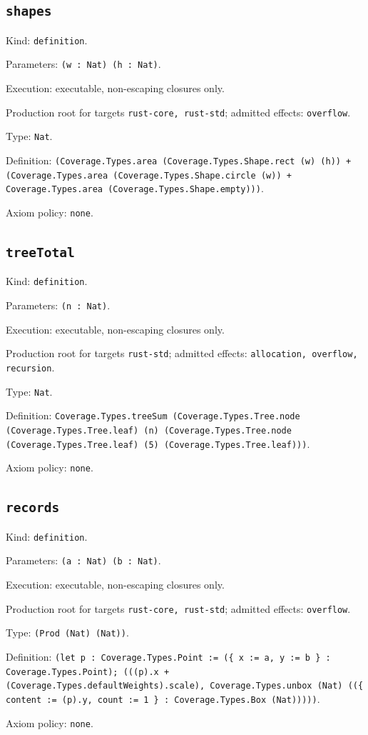 \documentclass[11pt]{article}
\begin{document}
\subsection*{\texttt{shapes}}
\noindent Kind: \texttt{definition}.\par
\noindent Parameters: \texttt{(w : Nat) (h : Nat)}.\par
\noindent Execution: executable, non-escaping closures only.\par
\noindent Production root for targets \texttt{rust-core, rust-std}; admitted effects: \texttt{overflow}.\par
\noindent Type: \texttt{Nat}.\par
\noindent Definition: \texttt{(Coverage.Types.area (Coverage.Types.Shape.rect (w) (h)) + (Coverage.Types.area (Coverage.Types.Shape.circle (w)) + Coverage.Types.area (Coverage.Types.Shape.empty)))}.\par
\noindent Axiom policy: \texttt{none}.\par
\subsection*{\texttt{treeTotal}}
\noindent Kind: \texttt{definition}.\par
\noindent Parameters: \texttt{(n : Nat)}.\par
\noindent Execution: executable, non-escaping closures only.\par
\noindent Production root for targets \texttt{rust-std}; admitted effects: \texttt{allocation, overflow, recursion}.\par
\noindent Type: \texttt{Nat}.\par
\noindent Definition: \texttt{Coverage.Types.treeSum (Coverage.Types.Tree.node (Coverage.Types.Tree.leaf) (n) (Coverage.Types.Tree.node (Coverage.Types.Tree.leaf) (5) (Coverage.Types.Tree.leaf)))}.\par
\noindent Axiom policy: \texttt{none}.\par
\subsection*{\texttt{records}}
\noindent Kind: \texttt{definition}.\par
\noindent Parameters: \texttt{(a : Nat) (b : Nat)}.\par
\noindent Execution: executable, non-escaping closures only.\par
\noindent Production root for targets \texttt{rust-core, rust-std}; admitted effects: \texttt{overflow}.\par
\noindent Type: \texttt{(Prod (Nat) (Nat))}.\par
\noindent Definition: \texttt{(let p : Coverage.Types.Point := (\{ x := a, y := b \} : Coverage.Types.Point); (((p).x + (Coverage.Types.defaultWeights).scale), Coverage.Types.unbox (Nat) ((\{ content := (p).y, count := 1 \} : Coverage.Types.Box (Nat)))))}.\par
\noindent Axiom policy: \texttt{none}.\par
\end{document}
